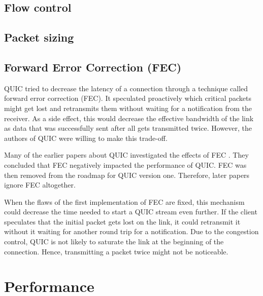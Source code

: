 \documentclass[conference]{IEEEtran}
\begin{document}
\subsection{Flow control}

\subsection{Packet sizing}
% 

\subsection{Forward Error Correction (FEC)}

QUIC tried to decrease the latency of a connection through a technique called forward error correction (FEC). It speculated proactively which critical packets might get lost and retransmits them without waiting for a notification from the receiver. As a side effect, this would decrease the effective bandwidth of the link as data that was successfully sent after all gets transmitted twice. However, the authors of QUIC were willing to make this trade-off. 

Many of the earlier papers about QUIC investigated the effects of FEC \cite{HTTPoverUDP}. They concluded that FEC negatively impacted the performance of QUIC. FEC was then removed from the roadmap for QUIC version one. Therefore, later papers ignore FEC altogether.

When the flaws of the first implementation of FEC are fixed, this mechanism could decrease the time needed to start a QUIC stream even further. If the client speculates that the initial packet gets lost on the link, it could retransmit it without it waiting for another round trip for a notification. Due to the congestion control, QUIC is not likely to saturate the link at the beginning of the connection. Hence, transmitting a packet twice might not be noticeable.


\section{Performance}
\label{sec:Performance}
\end{document}
